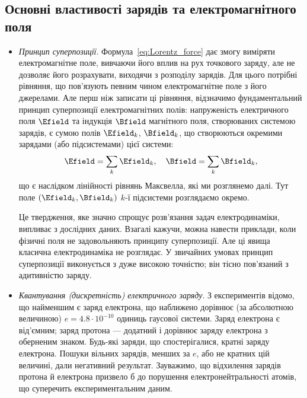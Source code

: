 \subsection*{Основні властивості зарядів та електромагнітного поля}

\begin{itemize}\setlength{\parindent}{2em}

	\item \textit{Принцип суперпозиції}. Формула~\eqref{eq:Lorentz_force} дає змогу виміряти електромагнітне поле,
	      вивчаючи його вплив на рух точкового заряду, але не дозволяє його розрахувати, виходячи з розподілу зарядів.
	      Для цього потрібні рівняння, що пов'язують певним чином електромагнітне поле з його джерелами. Але перш ніж
	      записати ці рівняння, відзначимо фундаментальний принцип суперпозиції електромагнітних полів: напруженість
	      електричного поля $\Efield$ та індукція $\Bfield$ магнітного поля, створюваних системою зарядів, є сумою полів
	      $\Efield_k$, $\Bfield_k$, що створюються окремими зарядами (або підсистемами) цієї системи:
	      \begin{equation}
		      \Efield = \sum\limits_k \Efield_k, \quad \Bfield = \sum\limits_k \Bfield_k,
	      \end{equation}
	      що є наслідком лінійності рівнянь Максвелла, які ми розглянемо далі. Тут поле $(\Efield_k, \Bfield_k)$ $k$-ї
	      підсистеми розглядаємо окремо.


	      Це твердження, яке значно спрощує розв'язання задач електродинаміки, випливає з дослідних даних. Взагалі
	      кажучи, можна навести приклади, коли фізичні поля не задовольняють принципу суперпозиції. Але ці явища
	      класична електродинаміка не розглядає. У звичайних умовах принцип суперпозиції виконується з дуже високою
	      точністю; він тісно пов'язаний з адитивністю заряду.


	\item \textit{Квантування (дискретність) електричного заряду}. З експериментів відомо, що
	      найменшим є заряд електрона, що наближено дорівнює (за абсолютною величиною) $e =
	      4.8\cdot10^{-10}$ одиниць гаусової системи. Заряд електрона є від'ємним; заряд протона --- додатний і дорівнює
	      заряду електрона з оберненим знаком. Будь-які заряди, що спостерігалися, кратні заряду електрона. Пошуки
	      вільних зарядів, менших за $e$, або не кратних цій величині, дали негативний результат. Зауважимо, що
	      відхилення зарядів протона й електрона призвело б до порушення електронейтральності атомів, що суперечить
	      експериментальним даним.



\end{itemize}
